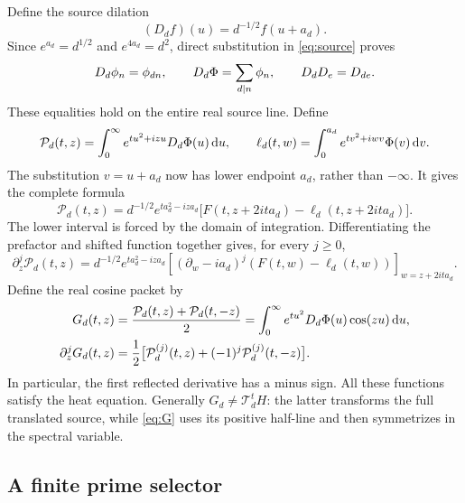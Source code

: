 Define the source dilation
\begin{equation}\label{eq:D}
 (D_df)(u)=d^{-1/2}f(u+a_d).
\end{equation}
Since $e^{a_d}=d^{1/2}$ and $e^{4a_d}=d^2$, direct substitution in
\eqref{eq:source} proves
\begin{equation}\label{eq:divisible}
 D_d\phi_n=\phi_{dn},\qquad
 D_d\Phi=\sum_{d\mid n}\phi_n,\qquad D_dD_e=D_{de}.
\end{equation}
These equalities hold on the entire real source line. Define
\[
 \mathcal P_d(t,z)=\int_0^\infty e^{tu^2+izu}D_d\Phi(u)\,\mathrm d u,
 \qquad
 \ell_d(t,w)=\int_0^{a_d}e^{tv^2+iwv}\Phi(v)\,\mathrm d v.
\]
The substitution $v=u+a_d$ now has lower endpoint $a_d$, rather than
$-\infty$. It gives the complete formula
\begin{equation}\label{eq:complete-packet}
 \boxed{\mathcal P_d(t,z)=d^{-1/2}e^{ta_d^2-iza_d}
 \bigl[F(t,z+2ita_d)-\ell_d(t,z+2ita_d)\bigr].}
\end{equation}
The lower interval is forced by the domain of integration. Differentiating
the prefactor and shifted function together gives, for every $j\ge0$,
\begin{equation}\label{eq:packet-jets}
 \partial_z^j\mathcal P_d(t,z)
 =d^{-1/2}e^{ta_d^2-iza_d}
 \left[(\partial_w-ia_d)^j(F(t,w)-\ell_d(t,w))\right]_{w=z+2ita_d}.
\end{equation}
Define the real cosine packet by
\begin{align}
 G_d(t,z)&=\frac{\mathcal P_d(t,z)+\mathcal P_d(t,-z)}2
       =\int_0^\infty e^{tu^2}D_d\Phi(u)\cos(zu)\,\mathrm d u,\label{eq:G}\\
 \partial_z^jG_d(t,z)&=\frac12\bigl[\mathcal P_d^{(j)}(t,z)
                    +(-1)^j\mathcal P_d^{(j)}(t,-z)\bigr].\label{eq:G-jets}
\end{align}
In particular, the first reflected derivative has a minus sign. All these
functions satisfy the heat equation. Generally $G_d\ne\mathcal T_d^tH$:
the latter transforms the full translated source, while \eqref{eq:G}
uses its positive half-line and then symmetrizes in the spectral variable.

\subsection{A finite prime selector}

